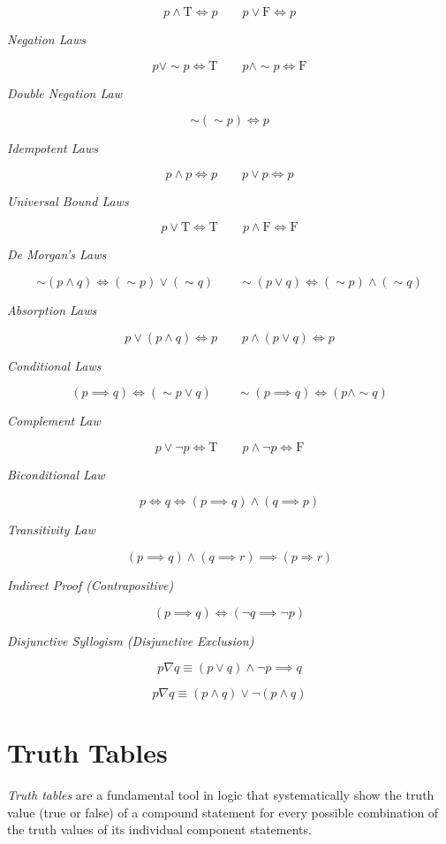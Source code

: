 \[
	p \land \text{T} \iff p \qquad p \lor \text{F} \iff p
\]

\emph{Negation Laws}

\[
	p \lor \sim p \iff \text{T} \qquad p \land \sim p \iff \text{F}
\]

\emph{Double Negation Law}

\[
	\sim(\sim p) \iff p
\]

\emph{Idempotent Laws}

\[
	p \land p \iff p \qquad p \lor p \iff p
\]

\emph{Universal Bound Laws}

\[
	p \lor \text{T} \iff \text{T} \qquad p \land \text{F} \iff \text{F}
\]

\emph{De Morgan’s Laws}

\[
	\sim (p \land q) \iff (\sim p) \lor (\sim q) \qquad
	\sim (p \lor q) \iff (\sim p) \land (\sim q)
\]

\emph{Absorption Laws}

\[
	p \lor (p \land q) \iff p \qquad p \land (p \lor q) \iff p
\]

\emph{Conditional Laws}

\[
	(p \implies q) \iff (\sim p \lor q) \qquad \sim(p \implies q) \iff (p \land \sim q)
\]

\emph{Complement Law}

\[
	p \lor \neg p \iff \text{T} \qquad p \land \neg p \iff \text{F}
\]

\emph{Biconditional Law}

\[
	p \iff q \iff (p \implies q) \land (q \implies p)
\]

\emph{Transitivity Law}

\[
	(p \implies q) \land (q \implies r) \implies (p \Rightarrow r)
\]

\emph{Indirect Proof (Contrapositive)}

\[
	(p \implies q) \iff (\neg q \implies \neg p)
\]

\emph{Disjunctive Syllogism (Disjunctive Exclusion)}

\[
	p \nabla q \equiv (p \lor q) \land \neg p \implies q
\]

\[
	p \nabla q \equiv(p \land q) \lor \neg  (p \land q)
\]

\section{Truth Tables}

\emph{Truth tables} are a fundamental tool in logic that systematically show the truth value
(true or false) of a compound statement for every possible combination of the truth values of
its individual component statements.

